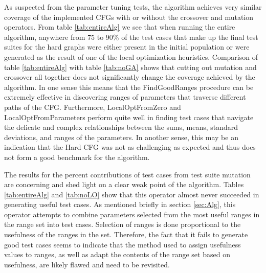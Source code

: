 \documentclass[runningheads]{llncs}
\begin{document}

As suspected from the parameter tuning tests, the algorithm achieves very similar coverage of the implemented CFGs with or without the crossover and mutation operators. From table \ref{tab:entireAlg} we see that when running the entire algorithm, anywhere from 75 to 90\% of the test cases that make up the final test suites for the hard graphs were either present in the initial population or were generated as the result of one of the local optimization heuristics. Comparison of table \ref{tab:entireAlg} with table \ref{tab:noGA} shows that cutting out mutation and crossover all together does not significantly change the coverage achieved by the algorithm. In one sense this means that the FindGoodRanges procedure can be extremely effective in discovering ranges of parameters that traverse different paths of the CFG. Furthermore, LocalOptFromZero and LocalOptFromParameters perform quite well in finding test cases that navigate the delicate and complex relationships between the sums, means, standard deviations, and ranges of the parameters. In another sense, this may be an indication that the Hard CFG was not as challenging as expected and thus does not form a good benchmark for the algorithm.

The results for the percent contributions of test cases from test suite mutation are concerning and shed light on a clear weak point of the algorithm. Tables \ref{tab:entireAlg} and \ref{tab:noLO} show that this operator almost never succeeded in generating useful test cases. As mentioned briefly in section \ref{sec:Alg}, this operator attempts to combine parameters selected from the most useful ranges in the range set into test cases. Selection of ranges is done proportional to the usefulness of the ranges in the set. Therefore, the fact that it fails to generate good test cases seems to indicate that the method used to assign usefulness values to ranges, as well as adapt the contents of the range set based on usefulness, are likely flawed and need to be revisited.
\end{document}
